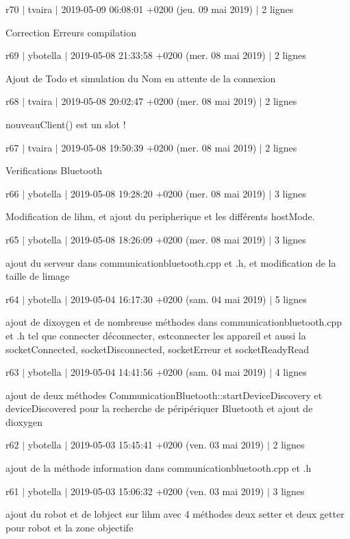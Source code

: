 r70 $\vert$ tvaira $\vert$ 2019-\/05-\/09 06\+:08\+:01 +0200 (jeu. 09 mai 2019) $\vert$ 2 lignes

Correction Erreurs compilation

r69 $\vert$ ybotella $\vert$ 2019-\/05-\/08 21\+:33\+:58 +0200 (mer. 08 mai 2019) $\vert$ 2 lignes

Ajout de Todo et simulation du Nom en attente de la connexion

r68 $\vert$ tvaira $\vert$ 2019-\/05-\/08 20\+:02\+:47 +0200 (mer. 08 mai 2019) $\vert$ 2 lignes

nouveau\+Client() est un slot !

r67 $\vert$ tvaira $\vert$ 2019-\/05-\/08 19\+:50\+:39 +0200 (mer. 08 mai 2019) $\vert$ 2 lignes

Verifications Bluetooth

r66 $\vert$ ybotella $\vert$ 2019-\/05-\/08 19\+:28\+:20 +0200 (mer. 08 mai 2019) $\vert$ 3 lignes

Modification de l\textquotesingle{}ihm, et ajout du peripherique et les différents host\+Mode.

r65 $\vert$ ybotella $\vert$ 2019-\/05-\/08 18\+:26\+:09 +0200 (mer. 08 mai 2019) $\vert$ 3 lignes

ajout du serveur dans communicationbluetooth.\+cpp et .h, et modification de la taille de l\textquotesingle{}image

r64 $\vert$ ybotella $\vert$ 2019-\/05-\/04 16\+:17\+:30 +0200 (sam. 04 mai 2019) $\vert$ 5 lignes

ajout de dixoygen et de nombreuse méthodes dans communicationbluetooth.\+cpp et .h tel que connecter déconnecter, estconnecter les appareil et aussi la socket\+Connected, socket\+Disconnected, socket\+Erreur et socket\+Ready\+Read

r63 $\vert$ ybotella $\vert$ 2019-\/05-\/04 14\+:41\+:56 +0200 (sam. 04 mai 2019) $\vert$ 4 lignes

ajout de deux méthodes Communication\+Bluetooth\+::start\+Device\+Discovery et device\+Discovered pour la recherche de péripériquer Bluetooth et ajout de dioxygen

r62 $\vert$ ybotella $\vert$ 2019-\/05-\/03 15\+:45\+:41 +0200 (ven. 03 mai 2019) $\vert$ 2 lignes

ajout de la méthode information dans communicationbluetooth.\+cpp et .h

r61 $\vert$ ybotella $\vert$ 2019-\/05-\/03 15\+:06\+:32 +0200 (ven. 03 mai 2019) $\vert$ 3 lignes

ajout du robot et de l\textquotesingle{}object sur l\textquotesingle{}ihm avec 4 méthodes deux setter et deux getter pour robot et la zone objectife

